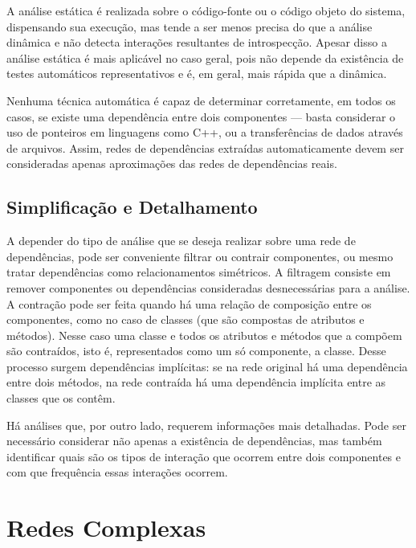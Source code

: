 \documentclass{article}
\begin{document}
A análise estática é realizada sobre o código-fonte ou o código objeto do sistema, dispensando sua execução, mas tende a ser menos precisa do que a análise dinâmica e não detecta interações resultantes de introspecção. Apesar disso a análise estática é mais aplicável no caso geral, pois não depende da existência de testes automáticos representativos e é, em geral, mais rápida que a dinâmica.

Nenhuma técnica automática é capaz de determinar corretamente, em todos os casos, se existe uma dependência entre dois componentes --- basta considerar o uso de ponteiros em linguagens como C++, ou a transferências de dados através de arquivos. Assim, redes de dependências extraídas automaticamente devem ser consideradas apenas aproximações das redes de dependências reais.

\subsection{Simplificação e Detalhamento}

A depender do tipo de análise que se deseja realizar sobre uma rede de dependências, pode ser conveniente filtrar ou contrair componentes, ou mesmo tratar dependências como relacionamentos simétricos. A filtragem consiste em remover componentes ou dependências consideradas desnecessárias para a análise. A contração pode ser feita quando há uma relação de composição entre os componentes, como no caso de classes (que são compostas de atributos e métodos). Nesse caso uma classe e todos os atributos e métodos que a compõem são contraídos, isto é, representados como um só componente, a classe. Desse processo surgem dependências implícitas: se na rede original há uma dependência entre dois métodos, na rede contraída há uma dependência implícita entre as classes que os contêm. %

Há análises que, por outro lado, requerem informações mais detalhadas. Pode ser necessário considerar não apenas a existência de dependências, mas também identificar quais são os tipos de interação que ocorrem entre dois componentes e com que frequência essas interações ocorrem.

\section{Redes Complexas}
\end{document}
